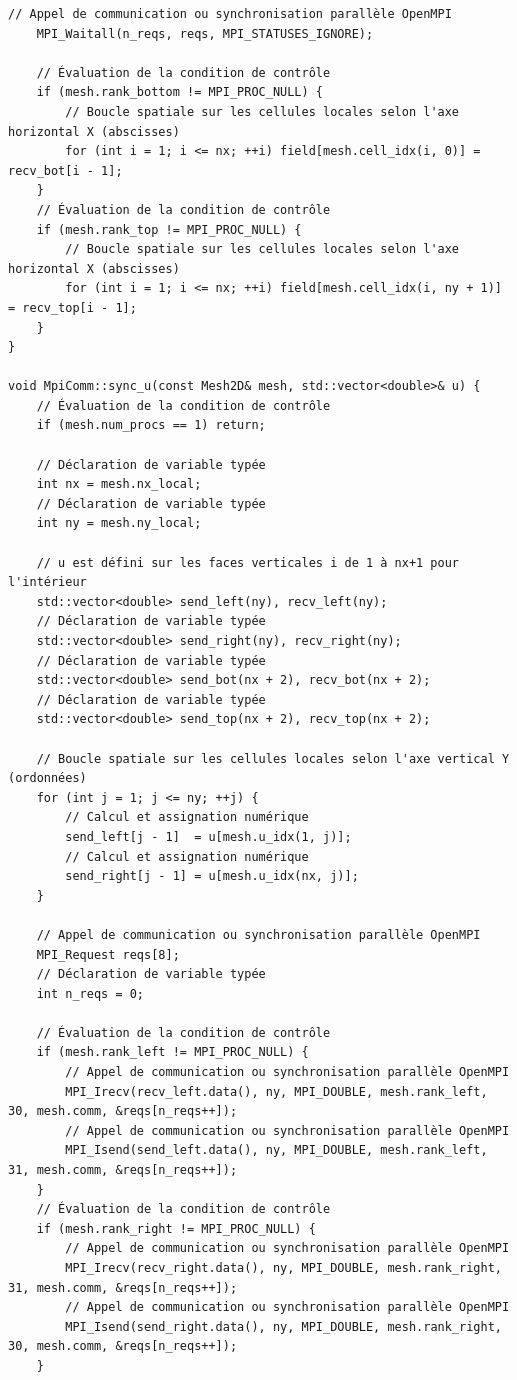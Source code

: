 \documentclass[10pt,a4paper,oneside]{book}
\begin{document}
\begin{lstlisting}[language={[11]C++}]
    // Appel de communication ou synchronisation parallèle OpenMPI
    MPI_Waitall(n_reqs, reqs, MPI_STATUSES_IGNORE);

    // Évaluation de la condition de contrôle
    if (mesh.rank_bottom != MPI_PROC_NULL) {
        // Boucle spatiale sur les cellules locales selon l'axe horizontal X (abscisses)
        for (int i = 1; i <= nx; ++i) field[mesh.cell_idx(i, 0)] = recv_bot[i - 1];
    }
    // Évaluation de la condition de contrôle
    if (mesh.rank_top != MPI_PROC_NULL) {
        // Boucle spatiale sur les cellules locales selon l'axe horizontal X (abscisses)
        for (int i = 1; i <= nx; ++i) field[mesh.cell_idx(i, ny + 1)] = recv_top[i - 1];
    }
}

void MpiComm::sync_u(const Mesh2D& mesh, std::vector<double>& u) {
    // Évaluation de la condition de contrôle
    if (mesh.num_procs == 1) return;

    // Déclaration de variable typée
    int nx = mesh.nx_local;
    // Déclaration de variable typée
    int ny = mesh.ny_local;

    // u est défini sur les faces verticales i de 1 à nx+1 pour l'intérieur
    std::vector<double> send_left(ny), recv_left(ny);
    // Déclaration de variable typée
    std::vector<double> send_right(ny), recv_right(ny);
    // Déclaration de variable typée
    std::vector<double> send_bot(nx + 2), recv_bot(nx + 2);
    // Déclaration de variable typée
    std::vector<double> send_top(nx + 2), recv_top(nx + 2);

    // Boucle spatiale sur les cellules locales selon l'axe vertical Y (ordonnées)
    for (int j = 1; j <= ny; ++j) {
        // Calcul et assignation numérique
        send_left[j - 1]  = u[mesh.u_idx(1, j)];
        // Calcul et assignation numérique
        send_right[j - 1] = u[mesh.u_idx(nx, j)];
    }

    // Appel de communication ou synchronisation parallèle OpenMPI
    MPI_Request reqs[8];
    // Déclaration de variable typée
    int n_reqs = 0;

    // Évaluation de la condition de contrôle
    if (mesh.rank_left != MPI_PROC_NULL) {
        // Appel de communication ou synchronisation parallèle OpenMPI
        MPI_Irecv(recv_left.data(), ny, MPI_DOUBLE, mesh.rank_left, 30, mesh.comm, &reqs[n_reqs++]);
        // Appel de communication ou synchronisation parallèle OpenMPI
        MPI_Isend(send_left.data(), ny, MPI_DOUBLE, mesh.rank_left, 31, mesh.comm, &reqs[n_reqs++]);
    }
    // Évaluation de la condition de contrôle
    if (mesh.rank_right != MPI_PROC_NULL) {
        // Appel de communication ou synchronisation parallèle OpenMPI
        MPI_Irecv(recv_right.data(), ny, MPI_DOUBLE, mesh.rank_right, 31, mesh.comm, &reqs[n_reqs++]);
        // Appel de communication ou synchronisation parallèle OpenMPI
        MPI_Isend(send_right.data(), ny, MPI_DOUBLE, mesh.rank_right, 30, mesh.comm, &reqs[n_reqs++]);
    }


\end{lstlisting}
\end{document}
